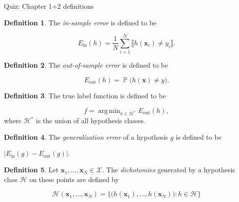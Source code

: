 \documentclass[10pt]{exam}
\theoremstyle{definition}
\newtheorem{defn}{Definition}
\DeclareMathOperator{\prob}{\mathbb P}
\DeclareMathOperator*{\argmin}{arg\,min}
\newcommand{\Ein}{E_{\text{in}}}
\newcommand{\Eout}{E_{\text{out}}}
\newcommand{\x}{\mathbf x}
\begin{document}
\begin{center}
{
\Huge
Quiz: Chapter 1+2 definitions
}
\end{center}

\begin{center}
\end{center}

\begin{defn}
    The \emph{in-sample error} is defined to be
    \begin{solutionorbox}[2in]
    \begin{equation*}
        \Ein(h) = \frac1N \sum_{i=1}^N \llbracket h(\x_i) \ne y_i \rrbracket
        .
    \end{equation*}
    \end{solutionorbox}
\end{defn}

\begin{defn}
    The \emph{out-of-sample error} is defined to be
    \begin{solutionorbox}
    \begin{equation*}
        \Eout(h) = \prob\big(h(\x) \ne y\big)
        .
    \end{equation*}
    \end{solutionorbox}
\end{defn}

\begin{defn}
    The true label function is defined to be
    \begin{solution}
    \begin{equation*}
        f = \argmin_{h \in \mathcal H^*} \Eout(h),
    \end{equation*}
    where $\mathcal H^*$ is the union of all hypothesis classes.
    \end{solution}
\end{defn}

\begin{defn}
    The \emph{generalization error} of a hypothesis $g$ is defined to be
    \begin{solutionorbox}
    $|\Ein(g) - \Eout(g)|$.
    \end{solutionorbox}
\end{defn}

\begin{defn}
    Let $\x_1,...,\x_N \in \mathcal X$.
    The \emph{dichotomies} generated by a hypothesis class $\mathcal H$ on these points are defined by
    \begin{solutionorbox}
    \begin{equation*}
        \mathcal H(\x_1, ..., \x_N) = \bigg\{ \big(h(\x_1), ..., h(\x_N)\big) : h \in \mathcal H \bigg\}
    \end{equation*}
    \end{solutionorbox}
\end{defn}
\end{document}
